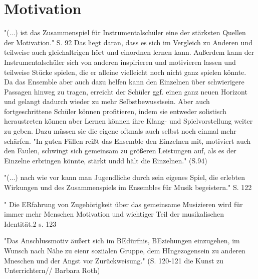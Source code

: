\section{Motivation}

"(...) ist das Zusammenspiel für Instrumentalschüler eine der stärksten Quellen
der Motivation." S. 92 Das liegt daran, dass es sich im Vergleich zu Anderen und
teilweise auch gleichaltrigen hört und einordnen lernen kann. Außerdem kann der Instrumentalschüler
sich von anderen inspirieren und motivieren lassen und teilweise Stücke spielen,
die er alleine vielleicht noch nicht ganz spielen könnte. Da das Ensemble aber
auch dazu helfen kann den Einzelnen über schwierigere Passagen hinweg zu tragen,
erreicht der Schüler ggf. einen ganz neuen Horizont und gelangt dadurch wieder
zu mehr Selbstbewusstsein. Aber auch fortgeschrittene Schüler können
profitieren, indem sie entweder solistisch heraustreten können aber Lernen
können ihre Klang- und Spielvorstellung weiter zu geben. Dazu müssen sie die
eigene oftmals auch selbst noch einmal mehr schärfen. "In guten Fällen reißt das
Ensemble den Einzelnen mit, motiviert auch den Faulen, schwingt sich gemeinsam
zu größeren Leistungen auf, als es der Einzelne erbringen könnte, stärkt undd
hält die Einzelnen." (S.94)


"(...) nach wie vor kann man Jugendliche durch sein eigenes Spiel, die erlebten
Wirkungen und des Zusammenspiels im Ensembles für Musik begeistern." S. 122


" Die ERfahrung von Zugehörigkeit über das gemeinsame Musizieren wird für immer
mehr Menschen Motivation und wichtiger Teil der musikalischen Identität.2 s. 123

"Das Anschlussmotiv äußert sich im BEdürfnis, BEziehungen einzugehen, im Wunsch
nach Nähe zu eienr soziialen Gruppe, dem HIngezogensein zu anderen Mneschen und
der Angst vor Zurückweisung." (S. 120-121 die Kunst zu Unterrichtern// Barbara Roth)
